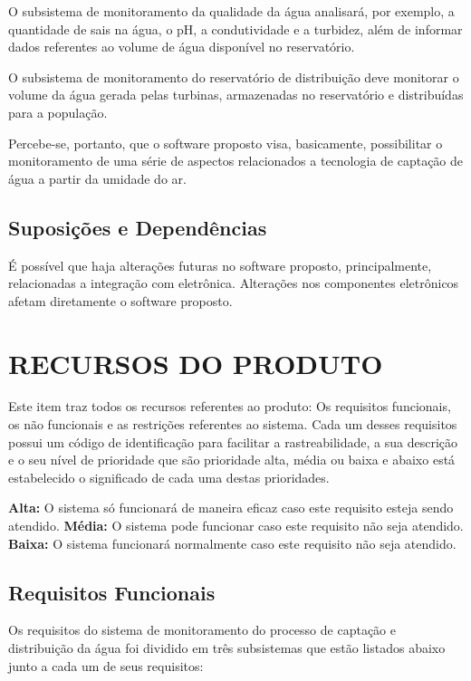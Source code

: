   O subsistema de monitoramento da qualidade da água analisará, por exemplo, a quantidade de sais na água, o pH, a condutividade e a 
  turbidez, além de informar dados referentes ao volume de água disponível no reservatório.
  
  O subsistema de monitoramento do reservatório de distribuição deve monitorar o volume da água gerada pelas turbinas, armazenadas
  no reservatório e distribuídas para a população.
  
  Percebe-se, portanto, que o software proposto visa, basicamente, possibilitar o monitoramento de uma série de aspectos relacionados a 
  tecnologia de captação de água a partir da umidade do ar.
  
  
  \subsection{Suposições e Dependências}
  É possível que haja alterações futuras no software proposto, principalmente, relacionadas a integração com eletrônica. Alterações 
  nos componentes eletrônicos afetam diretamente o software proposto.
  
  
  \section{RECURSOS DO PRODUTO}
  Este item traz todos os recursos referentes ao produto: Os requisitos funcionais, os não funcionais e as restrições referentes 
  ao sistema. Cada um desses requisitos possui um código de identificação para facilitar a rastreabilidade, a sua descrição e 
  o seu nível de prioridade que são prioridade alta, média ou baixa e abaixo está estabelecido o significado de cada uma 
  destas prioridades.
  
  \textbf{Alta:}  O sistema só funcionará de maneira eficaz caso este requisito esteja sendo atendido.
  \textbf{Média:} O sistema pode funcionar caso este requisito não seja atendido.
  \textbf{Baixa:} O sistema funcionará 	normalmente caso este requisito não seja atendido.
  
  
  \subsection{Requisitos Funcionais}
  
  Os requisitos do sistema de monitoramento do processo de captação e distribuição da água foi dividido em 
  três subsistemas que estão listados abaixo junto a cada um de seus requisitos:
  \pagebreak
  
